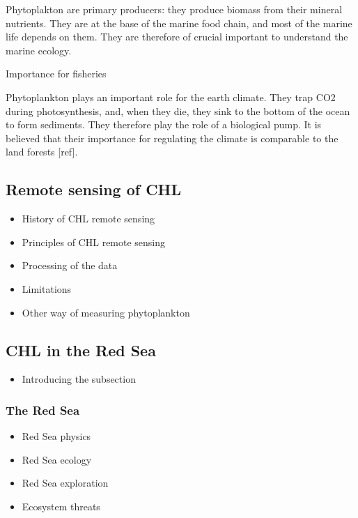 		Phytoplakton are primary producers: they produce biomass from their mineral nutrients. They are at the base of the marine food chain, and most of the marine life depends on them. They are therefore of crucial important to understand the marine ecology. 

		Importance for fisheries

		Phytoplankton plays an important role for the earth climate. They trap CO2 during photosynthesis, and, when they die, they sink to the bottom of the ocean to form sediments. They therefore play the role of a biological pump. It is believed that their importance for regulating the climate is comparable to the land forests [ref].

	\subsection{Remote sensing of CHL}
	\label{intro:context:sensing}

		\begin{itemize}
	      	\item History of CHL remote sensing
	      	\item Principles of CHL remote sensing
	      	\item Processing of the data
	      	\item Limitations
	      	\item Other way of measuring phytoplankton			
		\end{itemize}

	\subsection{CHL in the Red Sea}
	\label{intro:context:chlredsea}

		\begin{itemize}
			\item Introducing the subsection
		\end{itemize}

		\subsubsection{The Red Sea}

			\begin{itemize}
				\item Red Sea physics
				\item Red Sea ecology
				\item Red Sea exploration
				\item Ecosystem threats
			\end{itemize}

